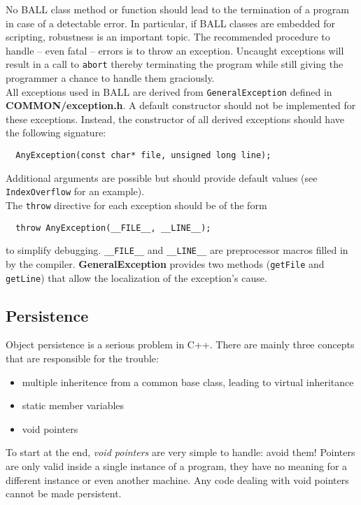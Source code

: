 \documentclass[a4paper,10pt]{article}
\begin{document}
No BALL class method or function should lead to the termination of a program
in case of a detectable error. In particular, if BALL classes are embedded 
for scripting, robustness is an important topic. The recommended
procedure to handle -- even fatal -- errors is to throw an exception. Uncaught
exceptions will result in a call to {\tt abort} thereby terminating the
program while still giving the programmer a chance to handle them graciously.\\
All exceptions used in BALL are derived from {\tt GeneralException}
defined in {\bf COMMON/exception.h}. A default constructor should not be
implemented for these exceptions. Instead, the constructor of all derived
exceptions should have the following signature:
\begin{verbatim}
  AnyException(const char* file, unsigned long line);
\end{verbatim}
Additional arguments are possible but should provide default values (see
{\tt IndexOverflow} for an example).\\
The {\tt throw} directive for each exception should be of the form
\begin{verbatim}
  throw AnyException(__FILE__, __LINE__);
\end{verbatim}
to simplify debugging. {\tt \_\_FILE\_\_} and {\tt \_\_LINE\_\_} are preprocessor
macros filled in by the compiler. {\bf GeneralException} provides two methods
({\tt getFile} and {\tt getLine}) that allow the localization of the
exception's cause.\\


\subsection{Persistence}

Object persistence is a serious problem in C++. There are mainly three
concepts that are responsible for the trouble:
\begin{itemize}
	\item multiple inheritence from a common base class, leading to virtual
		inheritance
	\item static member variables
	\item void pointers
\end{itemize}

To start at the end, {\em void pointers} are very simple to handle: avoid them!
Pointers are only valid inside a single instance of a program, they have no
meaning for a different instance or even another machine. Any code dealing
with void pointers cannot be made persistent.
\end{document}
